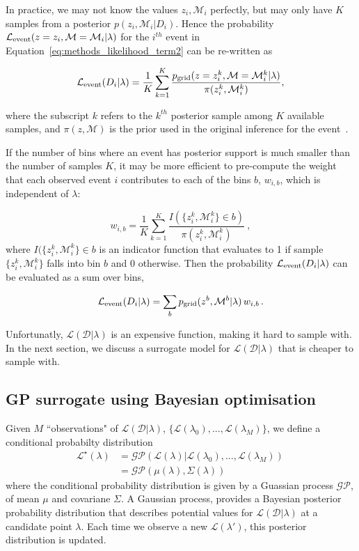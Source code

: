 \documentclass[twocolumn]{aastex631}
\newcommand{\Mc}{\ensuremath{\mathcal{M}}\xspace}
\newcommand{\Lmain}{\ensuremath{\mathcal{L}(\mathcal{D}|\lambda)}\xspace}
\newcommand{\Le}{\ensuremath{\mathcal{L}_{\rm event}}\xspace}
\newcommand{\pg}{\ensuremath{p_{\rm grid}}\xspace}
\newcommand{\Lsurr}{\ensuremath{\mathcal{L}^{\star}(\lambda)}\xspace}
\begin{document}
 In practice, we may not know the values $z_i, \Mc_{i}$ perfectly,  but may only have $K$ samples from a posterior $p(z_i,\Mc_{i}|D_i)$.
 Hence the probability $\Le(z=z_i,\Mc=\Mc_{i}|\lambda)$ for the  $i^{th}$ event in Equation~\ref{eq:methods_likelihood_term2} can be re-written as 

\begin{equation}
  \Le(D_i|\lambda) = \frac{1}{K} \sum_{k=1}^K \frac{\pg(z=z_i^k, \Mc=\Mc_{i}^k|\lambda)}{\pi(z_i^k,\Mc_i^k)},
  \label{eq:methods_likelihood_term2_LIGO}
\end{equation}

\bigskip\noindent
where the subscript $k$ refers to the $k^{th}$ posterior sample among $K$ available samples, and $\pi(z,\Mc)$ is the prior used in the original inference for the event~\citep[see, e.g.][]{Mandel_2019}.

 If the number of bins where an event has posterior support is much smaller than the number of samples $K$, it may be more efficient to pre-compute the weight that each observed event $i$ contributes to each of the bins $b$, $w_{i,b}$, which is independent of $\lambda$:

\begin{equation}
    w_{i,b} = \frac{1}{K} \sum^K_{k=1} \frac{I(\{z^k_i,\Mc^k_i\} \in b)}{\pi(z_i^k,\Mc_i^k)} \ ,
\end{equation}
where $I(\{z^k_i,\Mc^k_i\} \in b$ is an indicator function that evaluates to 1 if sample $\{z^k_i,\Mc^k_i\}$ falls into bin $b$ and $0$ otherwise.
Then the probability $\Le(D_i|\lambda)$ can be evaluated as a sum over bins,

\begin{equation}
    \Le(D_i|\lambda) = \sum_b \pg(z^b, \Mc^b | \lambda)\,  w_{i,b}\, .
\end{equation}


Unfortunatly, \Lmain is an expensive function, making it hard to sample with. 
In the next section, we discuss a surrogate model for \Lmain that is cheaper to sample with.

\subsection{GP surrogate using Bayesian optimisation }
Given  $M$ ``observations" of \Lmain, $\{\mathcal{L}(\lambda_0), ..., \mathcal{L}(\lambda_M)\}$, we  define a conditional probabilty distribution
\begin{align}
    \Lsurr &= \mathcal{GP}( \mathcal{L}(\lambda) | \mathcal{L}(\lambda_0), ..., \mathcal{L}(\lambda_M))\, \nonumber \\
    &= \mathcal{GP}(\mu(\lambda), \Sigma(\lambda))
\end{align}
where the conditional probability distribution is given by a Guassian process $\mathcal{GP}$, of mean $\mu$ and covariane $\Sigma$. 
A Gaussian process, provides a Bayesian posterior probability
distribution that describes potential values for $\Lmain$ at a candidate point $\lambda$. 
Each time we observe a new $\mathcal{L}(\lambda')$, this posterior distribution is updated.
\end{document}
